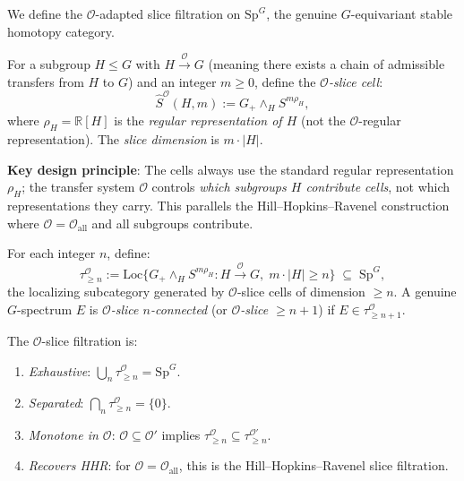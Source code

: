 We define the $\mathcal{O}$-adapted slice filtration on $\mathrm{Sp}^G$, the
genuine $G$-equivariant stable homotopy category.

\begin{definition}\label{def:p5-cells}
For a subgroup $H \leq G$ with $H \xrightarrow{\mathcal{O}} G$
(meaning there exists a chain of admissible transfers from $H$ to $G$)
and an integer $m \geq 0$, define the \emph{$\mathcal{O}$-slice cell}:
\[
  \widehat{S}^{\mathcal{O}}(H,m) := G_+ \wedge_H S^{m \rho_H},
\]
where $\rho_H = \mathbb{R}[H]$ is the \emph{regular representation of $H$}
(not the $\mathcal{O}$-regular representation).
The \emph{slice dimension} is $m \cdot |H|$.

\textbf{Key design principle}: The cells always use the standard regular
representation $\rho_H$; the transfer system $\mathcal{O}$ controls
\emph{which subgroups $H$ contribute cells}, not which representations
they carry. This parallels the Hill--Hopkins--Ravenel construction
\cite{HHR} where $\mathcal{O} = \mathcal{O}_{\mathrm{all}}$ and all
subgroups contribute.
\end{definition}

\begin{definition}\label{def:p5-filtration}
For each integer $n$, define:
\[
  \tau_{\geq n}^{\mathcal{O}} := \mathrm{Loc}\bigl\{
    G_+ \wedge_H S^{m\rho_H} :
    H \xrightarrow{\mathcal{O}} G,\;
    m \cdot |H| \geq n
  \bigr\} \;\subseteq\; \mathrm{Sp}^G,
\]
the localizing subcategory generated by $\mathcal{O}$-slice cells of
dimension $\geq n$. A genuine $G$-spectrum $E$ is \emph{$\mathcal{O}$-slice
$n$-connected} (or \emph{$\mathcal{O}$-slice $\geq n+1$}) if
$E \in \tau_{\geq n+1}^{\mathcal{O}}$.
\end{definition}

\begin{proposition}\label{prop:p5-basic}
The $\mathcal{O}$-slice filtration is:
\begin{enumerate}
  \item \emph{Exhaustive}: $\bigcup_n \tau_{\geq n}^{\mathcal{O}} = \mathrm{Sp}^G$.
  \item \emph{Separated}: $\bigcap_n \tau_{\geq n}^{\mathcal{O}} = \{0\}$.
  \item \emph{Monotone in $\mathcal{O}$}: $\mathcal{O} \subseteq \mathcal{O}'$ implies
    $\tau_{\geq n}^{\mathcal{O}} \subseteq \tau_{\geq n}^{\mathcal{O}'}$.
  \item \emph{Recovers HHR}: for $\mathcal{O} = \mathcal{O}_{\mathrm{all}}$, this is the
    Hill--Hopkins--Ravenel slice filtration.
\end{enumerate}
\end{proposition}

